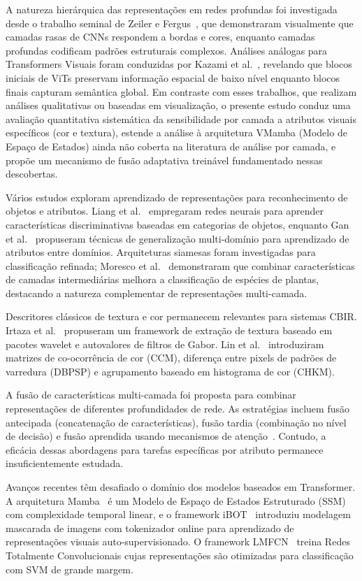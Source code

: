 \documentclass[conference]{IEEEtran}
\begin{document}
A natureza hierárquica das representações em redes profundas foi
investigada desde o trabalho seminal de Zeiler e Fergus~\cite{bzeiler},
que demonstraram visualmente que camadas rasas de CNNs respondem a bordas
e cores, enquanto camadas profundas codificam padrões estruturais
complexos.
Análises análogas para Transformers Visuais foram conduzidas por
Kazami et al.~\cite{bkazami}, revelando que blocos iniciais de ViTs
preservam informação espacial de baixo nível enquanto blocos finais
capturam semântica global.
Em contraste com esses trabalhos, que realizam análises qualitativas ou
baseadas em visualização, o presente estudo conduz uma avaliação
quantitativa sistemática da sensibilidade por camada a atributos visuais
específicos (cor e textura), estende a análise à arquitetura VMamba
(Modelo de Espaço de Estados) ainda não coberta na literatura de análise
por camada, e propõe um mecanismo de fusão adaptativa treinável
fundamentado nessas descobertas.

Vários estudos exploram aprendizado de representações para reconhecimento
de objetos e atributos.
Liang et al.~\cite{b10} empregaram redes neurais para aprender
características discriminativas baseadas em categorias de objetos, enquanto
Gan et al.~\cite{b11} propuseram técnicas de generalização multi-domínio
para aprendizado de atributos entre domínios.
Arquiteturas siamesas foram investigadas para classificação refinada;
Moresco et al.~\cite{b8} demonstraram que combinar características de
camadas intermediárias melhora a classificação de espécies de plantas,
destacando a natureza complementar de representações multi-camada.

Descritores clássicos de textura e cor permanecem relevantes para sistemas
CBIR.
Irtaza et al.~\cite{b13} propuseram um framework de extração de textura
baseado em pacotes wavelet e autovalores de filtros de Gabor.
Lin et al.~\cite{b15} introduziram matrizes de co-ocorrência de cor (CCM),
diferença entre pixels de padrões de varredura (DBPSP) e agrupamento
baseado em histograma de cor (CHKM).

A fusão de características multi-camada foi proposta para combinar
representações de diferentes profundidades de rede.
As estratégias incluem fusão antecipada (concatenação de características),
fusão tardia (combinação no nível de decisão) e fusão aprendida usando
mecanismos de atenção~\cite{b26,b27}.
Contudo, a eficácia dessas abordagens para tarefas específicas por atributo
permanece insuficientemente estudada.

Avanços recentes têm desafiado o domínio dos modelos baseados em
Transformer.
A arquitetura Mamba~\cite{b16} é um Modelo de Espaço de Estados
Estruturado (SSM) com complexidade temporal linear, e o framework
iBOT~\cite{b17} introduziu modelagem mascarada de imagens com
tokenizador online para aprendizado de representações visuais
auto-supervisionado.
O framework LMFCN~\cite{b28} treina Redes Totalmente Convolucionais cujas
representações são otimizadas para classificação com SVM de grande margem.
\end{document}
